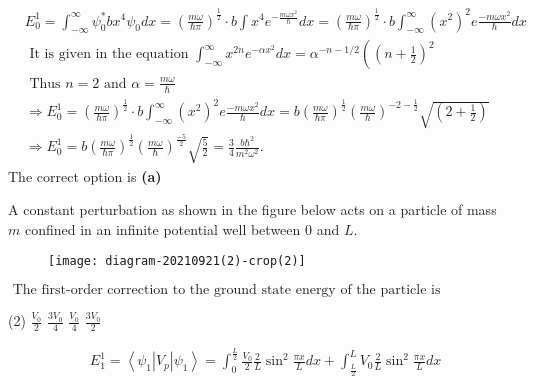 \begin{enumerate}
\begin{answer}
$$\begin{aligned}
	&E_{0}^{1}=\int_{-\infty}^{\infty} \psi_{0}^{*} b x^{4} \psi_{0} d x=\left(\frac{m \omega}{\hbar \pi}\right)^{\frac{1}{2}} \cdot b \int x^{4} e^{-\frac{m \omega x^{2}}{\hbar}} d x=\left(\frac{m \omega}{\hbar \pi}\right)^{\frac{1}{2}} \cdot b \int_{-\infty}^{\infty}\left(x^{2}\right)^{2} e \frac{-m \omega x^{2}}{\hbar} d x \\
	&\text { It is given in the equation } \int_{-\infty}^{\infty} x^{2 n} e^{-\alpha x^{2}} d x=\alpha^{-n-1 / 2}\left(\left(n+\frac{1}{2}\right)^{2}\right. \\
	&\text { Thus } n=2 \text { and } \alpha=\frac{m \omega}{\hbar} \\
	&\Rightarrow E_{0}^{1}=\left(\frac{m \omega}{\hbar \pi}\right)^{\frac{1}{2}} \cdot b \int_{-\infty}^{\infty}\left(x^{2}\right)^{2} e \frac{-m \omega x^{2}}{\hbar} d x=b\left(\frac{m \omega}{\hbar \pi}\right)^{\frac{1}{2}}\left(\frac{m \omega}{\hbar}\right)^{-2-\frac{1}{2}} \sqrt{\left(2+\frac{1}{2}\right)} \\
	&\Rightarrow E_{0}^{1}=b\left(\frac{m \omega}{\hbar \pi}\right)^{\frac{1}{2}}\left(\frac{m \omega}{\hbar}\right)^{\frac{-5}{2}} \sqrt{\frac{5}{2}}=\frac{3}{4} \frac{b \hbar^{2}}{m^{2} \omega^{2}} .
	\end{aligned}$$	
	The correct option is \textbf{(a)}
\end{answer}
\begin{minipage}{\textwidth}
	\item A constant perturbation as shown in the figure below acts on a particle of mass $m$ confined in an infinite potential well between 0 and $L$.\\
	\begin{figure}[H]
		\centering
		\texttt{[image: diagram-20210921(2)-crop(2)]}
	\end{figure}
	$\text { The first-order correction to the ground state energy of the particle is }$
\end{minipage}
\begin{tasks}(2)
	\task[\textbf{A.}] $\frac{V_{0}}{2}$
	\task[\textbf{B.}]$\frac{3 V_{0}}{4}$
	\task[\textbf{C.}]$\frac{V_{0}}{4}$
	\task[\textbf{D.}] $\frac{3 V_{0}}{2}$
\end{tasks}
\begin{answer}
	$$\begin{aligned}
	&E_{1}^{1}=\left\langle\psi_{1}\left|V_{p}\right| \psi_{1}\right\rangle=\int_{0}^{\frac{L}{2}} \frac{V_{0}}{2} \frac{2}{L} \sin ^{2} \frac{\pi x}{L} d x+\int_{\frac{L}{2}}^{L} V_{0} \frac{2}{L} \sin ^{2} \frac{\pi x}{L} d x \\

\end{aligned}$$
\end{answer}
\end{enumerate}
